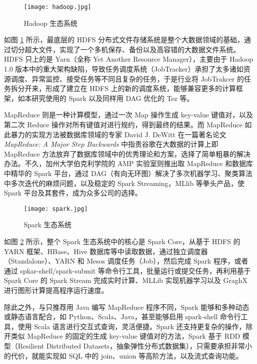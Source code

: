 \begin{figure}[htpb]
    \centering
    \texttt{[image: hadoop.jpg]}
    \caption{Hadoop 生态系统}
    \label{fig:hadoop}
\end{figure}

如图 \ref{fig:hadoop} 所示，最底层的 HDFS 分布式文件存储系统是整个大数据领域的基础，通过切分超大文件，实现了一个多机保存、备份以及高容错的大数据文件系统。HDFS 只上的是 Yarn（全称 Yet Another Resource Manager），主要由于 Hadoop 1.0 版本中的重大架构缺陷，导致任务调度系统（JobTracker）承担了太多诸如资源调度、异常监控、接受任务等不同且复杂的任务，于是行业将 JobTrakcer 的任务拆分开来，形成了建立在 HDFS 上的新的调度系统，能够兼容更多的计算框架，如本研究使用的 Spark 以及同样用 DAG 优化的 Tez 等。

MapReduce 则是一种计算模型，通过一次 Map 操作生成 key-value 键值对，以及第二次 Reduce 操作对所有键值对进行规约，得到最终的结果。而 MapReduce 如此暴力的实现方法被数据库领域的专家 David J. DeWitt\cite{mr_back} 在一篇著名论文 \emph{MapReduce: A Major Step Backwards} 中指责谷歌在大数据的计算上即 MapReduce 方法放弃了数据库领域中的优秀理论和方案，选择了简单粗暴的解决办法。不久，加州大学伯克利学院的 AMP 实验室则推出取 MapReduce 和数据库中精华的 Spark 平台，通过 DAG（有向无环图）解决了多次机器学习、聚类算法中多次迭代的麻烦问题，以及稳定的 Spark Streaming，MLlib 等拳头产品，使 Spark 平台及其套件，成为众多公司的选择。

\begin{figure}[htpb]
    \centering
    \texttt{[image: spark.jpg]}
    \caption[fig:spark]{Spark 生态系统}
    \label{fig:spark}
\end{figure}

如图 \ref{fig:spark} 所示，整个 Spark 生态系统中的核心是 Spark Core，从基于 HDFS 的 YARN 框架、HBase、Hive 数据库等中读取数据，通过独立调度器（Standalone）、YARN 和 Mesos 调度任务（Job），然后完成 Spark 程序，或者通过 spkar-shell/spark-submit 等命令行工具，批量运行或提交任务，再利用基于 Spark Core 的 Spark Stream 完成实时计算、MLLib 实现机器学习以及 GraghX 进行图形计算提高程序运行速度。

除此之外，与只推荐用 Java 编写 MapReduce 程序不同，Spark 能够和多种动态或静态语言配合，如 Python、Scala、Java，甚至能够启用 spark-shell 命令行工具，使用 Scala 语言进行交互式查询，灵活便捷。Spark 还支持更复杂的操作，除开类似 MapReduce 的固定的生成 key-value 键值对的方法，Spark 基于 RDD 模型（Resilient Distributed Datasets，抽象弹性分布式数据集），只需要承担非常小的代价，就能实现如 SQL 中的 join、union 等高阶方法，以及流式查询功能。

